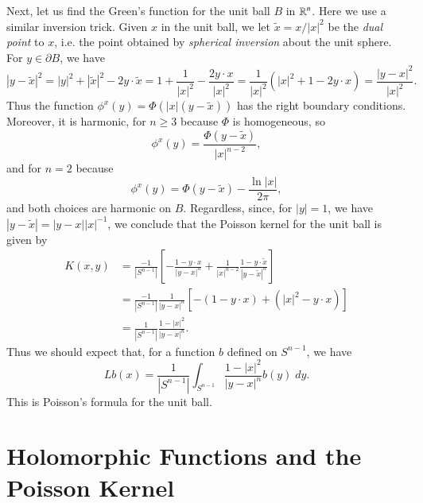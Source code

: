 Next, let us find the Green's function for the unit ball $B$ in $\operatorname{\mathbb{R}}^n$. Here we use a similar inversion trick. Given $x$ in the unit ball, we let $\tilde{x} = x / |x|^2$ be the \emph{dual point} to $x$, i.e. the point obtained by \emph{spherical inversion} about the unit sphere. For $y \in \partial B$, we have
%
\[ |y - \tilde{x}|^2 = |y|^2 + |\tilde{x}|^2 - 2 y \cdot \tilde{x} = 1 + \frac{1}{|x|^2} - \frac{2 y \cdot x}{|x|^2} = \frac{1}{|x|^2} \left( |x|^2 + 1 - 2 y \cdot x \right) = \frac{|y - x|^2}{|x|^2}. \]
%
Thus the function $\phi^x(y) = \Phi(|x| (y - \tilde{x}))$ has the right boundary conditions. Moreover, it is harmonic, for $n \geq 3$ because $\Phi$ is homogeneous, so
%
\[ \phi^x(y) = \frac{\Phi(y - \tilde{x})}{|x|^{n-2}}, \]
%
and for $n = 2$ because
%
\[ \phi^x(y) = \Phi(y - \tilde{x}) - \frac{\ln |x|}{2 \pi}, \]
%
and both choices are harmonic on $B$. Regardless, since, for $|y| = 1$, we have $|y - \tilde{x}| = |y - x| |x|^{-1}$, we conclude that the Poisson kernel for the unit ball is given by
\begin{align*}
    K(x,y) &= \frac{-1}{|S^{n-1}|} \left[ - \frac{1 - y \cdot x}{|y - x|^n} + \frac{1}{|x|^{n-2}} \frac{1 - y \cdot \tilde{x}}{|y - \tilde{x}|^n} \right]\\
    &= \frac{-1}{|S^{n-1}|} \frac{1}{|y - x|^n} \left[ - (1 - y \cdot x) + (|x|^2 - y \cdot x) \right]\\
    &= \frac{1}{|S^{n-1}|} \frac{1 - |x|^2}{|y - x|^n}.
\end{align*}
%
Thus we should expect that, for a function $b$ defined on $S^{n-1}$, we have
%
\[ Lb(x) = \frac{1}{|S^{n-1}|} \int_{S^{n-1}} \frac{1 - |x|^2}{|y - x|^n} b(y)\; dy. \]
%
This is Poisson's formula for the unit ball.

\section{Holomorphic Functions and the Poisson Kernel}


